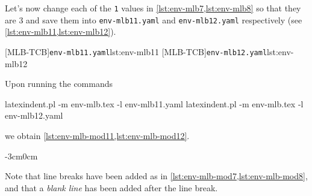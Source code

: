 \documentclass[10pt]{article}
\newenvironment{widepage}{\begin{adjustwidth}{-3cm}{0cm}}{\end{adjustwidth}}
\begin{document}
  \begin{example}
  Let's now change each of the \texttt{1} values in \cref{lst:env-mlb7,lst:env-mlb8} so
  that they are $3$ and save them into \texttt{env-mlb11.yaml} and
  \texttt{env-mlb12.yaml} respectively (see \cref{lst:env-mlb11,lst:env-mlb12}).

  \begin{cmhtcbraster}
   [MLB-TCB]{\texttt{env-mlb11.yaml}}{lst:env-mlb11}
   [MLB-TCB]{\texttt{env-mlb12.yaml}}{lst:env-mlb12}
  \end{cmhtcbraster}

  Upon running the commands

  \begin{commandshell}
latexindent.pl -m env-mlb.tex -l env-mlb11.yaml
latexindent.pl -m env-mlb.tex -l env-mlb12.yaml
\end{commandshell}

  we obtain \cref{lst:env-mlb-mod11,lst:env-mlb-mod12}.

  \begin{widepage}
   \begin{minipage}{.42\linewidth}
   \end{minipage}
   \hfill
   \begin{minipage}{.57\linewidth}
   \end{minipage}
  \end{widepage}

  Note that line breaks have been added as in \cref{lst:env-mlb-mod7,lst:env-mlb-mod8},
  and that a \emph{blank line} has been added after the line break.
  \end{example}
\end{document}
